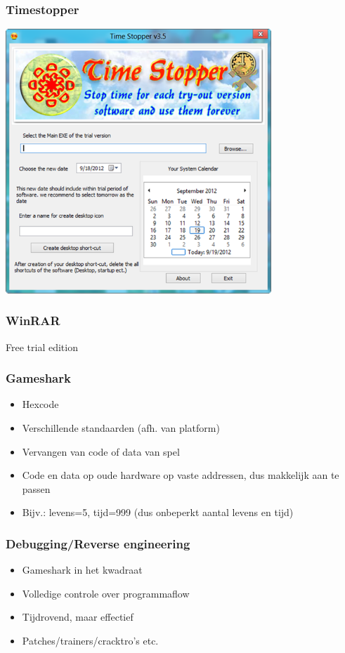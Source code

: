 \documentclass{beamer}
\begin{document}
\begin{frame}
	\frametitle{Timestopper}

	\begin{center}
	\includegraphics[width=0.75\textwidth]{Time-Stopper.png}
	\end{center}
\end{frame}

\begin{frame}
	\frametitle{WinRAR}

	Free trial edition
\end{frame}

\begin{frame}
	\frametitle{Gameshark}

	\begin{itemize}
		\item Hexcode
		\item Verschillende standaarden (afh. van platform)
		\item Vervangen van code of data van spel
		\item Code en data op oude hardware op vaste addressen, dus makkelijk aan te passen
		\item Bijv.: levens=5, tijd=999 (dus onbeperkt aantal levens en tijd)
	\end{itemize}
\end{frame}

\begin{frame}
	\frametitle{Debugging/Reverse engineering}

	\begin{itemize}
		\item Gameshark in het kwadraat
		\item Volledige controle over programmaflow
		\item Tijdrovend, maar effectief
		\item Patches/trainers/cracktro's etc.
	\end{itemize}
\end{frame}
\end{document}
